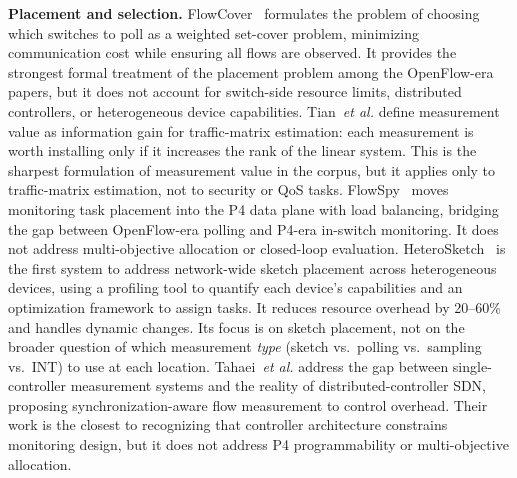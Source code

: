 \documentclass[letterpaper,twocolumn,10pt]{article}
\newcommand{\etal}{\textit{et al.}\xspace}
\newcommand{\para}[1]{\smallskip\noindent\textbf{#1.}}
\begin{document}
\para{Placement and selection}
FlowCover~\cite{su2014flowcover} formulates the problem of
choosing which switches to poll as a weighted set-cover problem,
minimizing communication cost while ensuring all flows are
observed. It provides the strongest formal treatment of the
placement problem among the OpenFlow-era papers, but it does not
account for switch-side resource limits, distributed controllers,
or heterogeneous device capabilities.
Tian~\etal\cite{tian2018trafficmatrix} define measurement value
as information gain for traffic-matrix estimation: each
measurement is worth installing only if it increases the rank of
the linear system. This is the sharpest formulation of measurement
value in the corpus, but it applies only to traffic-matrix
estimation, not to security or QoS tasks.
FlowSpy~\cite{guan2019flowspy} moves monitoring task placement
into the P4 data plane with load balancing, bridging the gap
between OpenFlow-era polling and P4-era in-switch monitoring. It
does not address multi-objective allocation or closed-loop
evaluation.
HeteroSketch~\cite{agarwal2022heterosketch} is the first system
to address network-wide sketch placement across heterogeneous
devices, using a profiling tool to quantify each device's
capabilities and an optimization framework to assign tasks. It
reduces resource overhead by 20--60\% and handles dynamic changes.
Its focus is on sketch placement, not on the broader question of
which measurement \emph{type} (sketch vs.\ polling vs.\ sampling
vs.\ INT) to use at each location.
Tahaei~\etal\cite{tahaei2018distributed} address the gap between
single-controller measurement systems and the reality of
distributed-controller SDN, proposing synchronization-aware flow
measurement to control overhead. Their work is the closest to
recognizing that controller architecture constrains monitoring
design, but it does not address P4 programmability or
multi-objective allocation.
\end{document}
